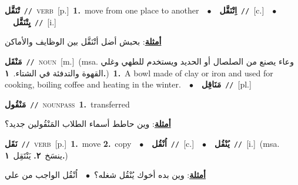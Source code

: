 \documentclass[10pt,a4paper,twoside]{article} %
\begin{document}
\begin{multicols}{2}
{\setlength\topsep{0pt}\textbf{\foreignlanguage{arabic}{تْنَقَّل}}\ {\color{gray}\texttt{//}\color{black}}\ \textsc{verb}\ [p.]\ \textbf{1.}~move from one place to another\ \ $\bullet$\ \ \setlength\topsep{0pt}\textbf{\foreignlanguage{arabic}{اِتْنَقَّل}}\ {\color{gray}\texttt{//}\color{black}}\ [c.]\ \ $\bullet$\ \ \setlength\topsep{0pt}\textbf{\foreignlanguage{arabic}{يِتْنَقَّل}}\ {\color{gray}\texttt{//}\color{black}}\ [i.]\  \begin{flushright}\color{gray}\foreignlanguage{arabic}{\textbf{\underline{\foreignlanguage{arabic}{أمثلة}}}: بحبش أضل أتْنَقَّل بين الوظايف والأماكن}\end{flushright}\color{black}} \vspace{2mm}

{\setlength\topsep{0pt}\textbf{\foreignlanguage{arabic}{مَنْقَل}}\ {\color{gray}\texttt{//}\color{black}}\ \textsc{noun}\ [m.]\ \color{gray}(msa. \foreignlanguage{arabic}{وعاء يصنع من الصلصال أو الحديد ويستخدم للطهي وغلي القهوة والتدفئة في الشتاء.}~\foreignlanguage{arabic}{\textbf{١.}})\color{black}\ \textbf{1.}~A bowl made of clay or iron and used for cooking, boiling coffee and heating in the winter.\ \ $\bullet$\ \ \setlength\topsep{0pt}\textbf{\foreignlanguage{arabic}{مَنَاقِل}}\ {\color{gray}\texttt{//}\color{black}}\ [pl.]\ } \vspace{2mm}

{\setlength\topsep{0pt}\textbf{\foreignlanguage{arabic}{مَنْقُول}}\ {\color{gray}\texttt{//}\color{black}}\ \textsc{noun\textunderscore pass}\ \textbf{1.}~transferred\  \begin{flushright}\color{gray}\foreignlanguage{arabic}{\textbf{\underline{\foreignlanguage{arabic}{أمثلة}}}: وين حاطط أسماء الطلاب المَنْقُولين جديد؟}\end{flushright}\color{black}} \vspace{2mm}

{\setlength\topsep{0pt}\textbf{\foreignlanguage{arabic}{نَقَل}}\ {\color{gray}\texttt{//}\color{black}}\ \textsc{verb}\ [p.]\ \textbf{1.}~move  \textbf{2.}~copy\ \ $\bullet$\ \ \setlength\topsep{0pt}\textbf{\foreignlanguage{arabic}{اُنْقُل}}\ {\color{gray}\texttt{//}\color{black}}\ [c.]\ \ $\bullet$\ \ \setlength\topsep{0pt}\textbf{\foreignlanguage{arabic}{يُنْقُل}}\ {\color{gray}\texttt{//}\color{black}}\ [i.]\ \color{gray}(msa. \foreignlanguage{arabic}{ينسَخ}~\foreignlanguage{arabic}{\textbf{٢.}}  \foreignlanguage{arabic}{يَنْتَقِل}~\foreignlanguage{arabic}{\textbf{١.}})\color{black}\  \begin{flushright}\color{gray}\foreignlanguage{arabic}{\textbf{\underline{\foreignlanguage{arabic}{أمثلة}}}: وين بده أخوك يُنْقُل شغله؟\ $\bullet$\ \  اُنْقُل الواجب من علي}\end{flushright}\color{black}} \vspace{2mm}


\end{multicols}
\end{document}
